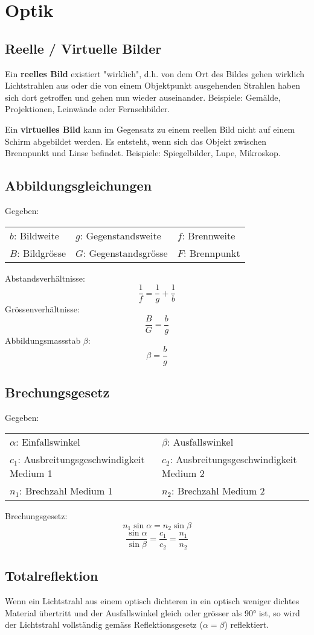 \section{Optik}

\subsection{Reelle / Virtuelle Bilder}

Ein \textbf{reelles Bild} existiert "wirklich", d.h. von dem Ort des Bildes
gehen wirklich Lichtstrahlen aus oder die von einem Objektpunkt ausgehenden
Strahlen haben sich dort getroffen und gehen nun wieder auseinander. Beispiele:
Gemälde, Projektionen, Leinwände oder Fernsehbilder.

Ein \textbf{virtuelles Bild} kann im Gegensatz zu einem reellen Bild nicht auf
einem Schirm abgebildet werden. Es entsteht, wenn sich das Objekt zwischen
Brennpunkt und Linse befindet. Beispiele: Spiegelbilder, Lupe, Mikroskop.

\subsection{Abbildungsgleichungen}

Gegeben:

\begin{tabular}{lll}
	$b$: Bildweite & $g$: Gegenstandsweite & $f$: Brennweite \\
	$B$: Bildgrösse & $G$: Gegenstandsgrösse & $F$: Brennpunkt
\end{tabular}

Abstandsverhältnisse:
\[
	\frac{1}{f} = \frac{1}{g} + \frac{1}{b}
\]
Grössenverhältnisse:
\[
	\frac{B}{G} = \frac{b}{g}
\]
Abbildungsmassstab $\beta$:
\[
	\beta = \frac{b}{g}
\]

\subsection{Brechungsgesetz}

Gegeben:

\begin{tabular}{ll}
	$\alpha$: Einfallswinkel & $\beta$: Ausfallswinkel \\
	$c_1$: Ausbreitungsgeschwindigkeit Medium 1 & $c_2$: Ausbreitungsgeschwindigkeit Medium 2 \\
	$n_1$: Brechzahl Medium 1 & $n_2$: Brechzahl Medium 2
\end{tabular}

Brechungsgesetz:
\[
	n_1 \sin \alpha = n_2 \sin \beta
\]
\[
	\frac{\sin \alpha}{\sin \beta} = \frac{c_1}{c_2} = \frac{n_1}{n_2}
\]

\subsection{Totalreflektion}

Wenn ein Lichtstrahl aus einem optisch dichteren in ein optisch weniger dichtes
Material übertritt und der Ausfallswinkel gleich oder grösser als 90° ist, so
wird der Lichtstrahl vollständig gemäss Reflektionsgesetz ($\alpha = \beta$)
reflektiert.
